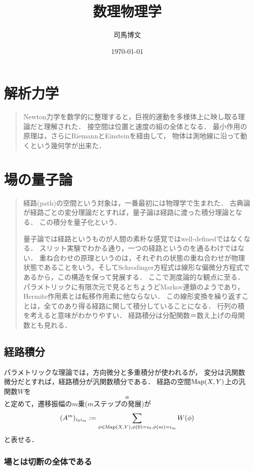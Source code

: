 \documentclass[uplatex,dvipdfmx]{jsreport}
\title{数理物理学}
\author{司馬博文}
\date{\today}
\begin{document}
\tableofcontents

\chapter{解析力学}

\begin{quotation}
    Newton力学を数学的に整理すると，巨視的運動を多様体上に映し取る理論だと理解された．
    接空間は位置と速度の組の全体となる．
    最小作用の原理は，さらにRiemannとEinsteinを経由して，
    物体は測地線に沿って動くという幾何学が出来た．
\end{quotation}

\chapter{場の量子論}

\begin{quotation}
    経路(path)の空間という対象は，一番最初には物理学で生まれた．
    古典論が経路ごとの変分理論だとすれば，量子論は経路に渡った積分理論となる．
    この積分を量子化という．

    量子論では経路というものが人間の素朴な感覚ではwell-definedではなくなる．
    スリット実験でわかる通り，一つの経路というのを通るわけではない．
    重ね合わせの原理というのは，それぞれの状態の重ね合わせが物理状態であることをいう，そしてSchrodinger方程式は線形な偏微分方程式であるから，この構造を保って発展する．
    ここで測度論的な観点に至る．
    パラメトリックに有限次元で見るとちょうどMarkov連鎖のようであり，Hermite作用素とは転移作用素に他ならない．
    この線形変換を繰り返すことは，全てのあり得る経路に関して積分していることになる．
    行列の積を考えると意味がわかりやすい．
    経路積分は分配関数＝数え上げの母関数とも見れる．
\end{quotation}

\section{経路積分}

パラメトリックな理論では，方向微分と多重積分が使われるが，
変分は汎関数微分だとすれば，経路積分が汎関数積分である．
経路の空間$\mathrm{Map}(X,Y)$上の汎関数$W$を
\[a\]
と定めて，遷移振幅の$m$乗($m$ステップの発展)が
\[(A^m)_{i_0i_m}:=\sum_{\phi\in\mathrm{Map}(X,Y),\phi(0)=i_0,\phi(m)=i_m}W(\phi)\]
と表せる．

\subsection{場とは切断の全体である}
\end{document}
